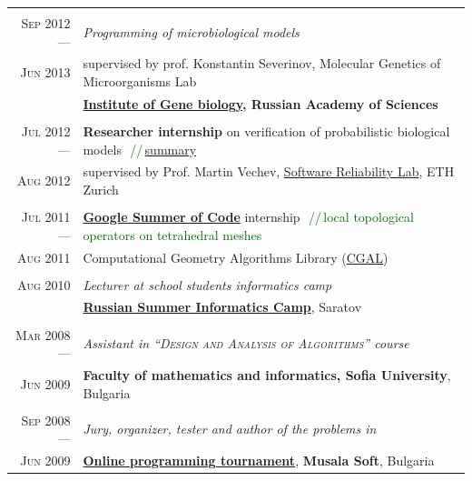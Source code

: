 \documentclass[a4paper,10pt]{article}
\def\myline{\color{linegray}\vline}
\newcommand{\minorcolor}[1]{\textcolor{mygray}{#1}}
\newcommand{\comment}[1]{\small\textcolor{darkgreen}{\,\,//\,#1}}
\newcommand{\mydate}[1]{\minorcolor{\textsc{#1}}}
\begin{document}
{\begin{tabular}{r!{\myline}p{14cm}}
        \\
	\mydate{Sep 2012 ---}      &  \textit{Programming of microbiological models}\\
        \mydate{Jun 2013}  &  supervised by prof. Konstantin Severinov, Molecular Genetics of Microorganisms Lab\\
                                  &  \textbf{\href{http://www.genebiology.ru/}{Institute of Gene biology}, Russian Academy of Sciences}\\
	
        \\
        \mydate{Jul 2012 ---}      &  \textbf{Researcher internship} on verification of probabilistic biological models \comment{\href{https://docs.google.com/document/d/1tNkXLaWY3ooA4MEnrbrL2_DOpOaiTlLoFblwzKFZdy0/edit?usp=sharing}{summary}}\\
        \mydate{Aug 2012} &  supervised by Prof. Martin Vechev, \href{http://www.srl.inf.ethz.ch/}{Software Reliability Lab}, ETH Zurich\\
	
        \\
        \mydate{Jul 2011 ---}      &  \textbf{\href{http://code.google.com/soc/}{Google Summer of Code} } internship \comment{local topological operators on tetrahedral meshes}\\
        \mydate{Aug 2011}         &  Computational Geometry Algorithms Library (\href{http://www.cgal.org/}{CGAL})\\
	
        \\
	\mydate{Aug 2010}         &  \textit{Lecturer at school students informatics camp}\\
	                          &  \textbf{\href{http://lksh.ru/}{Russian Summer Informatics Camp}}, Saratov\vspace{-5mm}\\
	
	\\
	\mydate{Mar 2008 ---}      &  \textit{Assistant in \textsc{``Design and Analysis of Algorithms''} course}\\
	\mydate{Jun 2009}        &  \textbf{Faculty of mathematics and informatics, Sofia University}, Bulgaria\\

	\\
	\mydate{Sep 2008 ---}     &  \textit{Jury, organizer, tester and \textit{author} of the problems in}\\
        \mydate{Jun 2009}        &  \textbf{\href{http://konkurs.musala.com/}{Online programming tournament}}, \textbf{Musala Soft}, Bulgaria\\


\end{tabular}}
\end{document}
